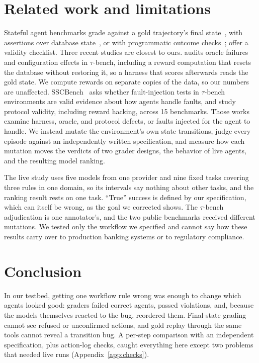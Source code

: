 \documentclass[11pt,a4paper]{article}
\begin{document}
\section{Related work and limitations}

Stateful agent benchmarks grade against a gold trajectory's final state~\citep{yao2025taubench,barres2025tau2}, with assertions over database state~\citep{trivedi2024appworld}, or with programmatic outcome checks~\citep{zhou2024webarena,jimenez2024swebench}; \citet{zhu2025abc} offer a validity checklist. Three recent studies are closest to ours. \citet{chen2026unreliable} audits oracle failures and configuration effects in $\tau$-bench, including a reward computation that resets the database without restoring it, so a harness that scores afterwards reads the gold state. We compute rewards on separate copies of the data, so our numbers are unaffected. SSCBench~\citep{he2026sscbench} asks whether fault-injection tests in $\tau$-bench environments are valid evidence about how agents handle faults, and \citet{shao2026protocol} study protocol validity, including reward hacking, across 15 benchmarks. Those works examine harness, oracle, and protocol defects, or faults injected for the agent to handle. We instead mutate the environment's own state transitions, judge every episode against an independently written specification, and measure how each mutation moves the verdicts of two grader designs, the behavior of live agents, and the resulting model ranking.

The live study uses five models from one provider and nine fixed tasks covering three rules in one domain, so its intervals say nothing about other tasks, and the ranking result rests on one task. ``True'' success is defined by our specification, which can itself be wrong, as the goal we corrected shows. The $\tau$-bench adjudication is one annotator's, and the two public benchmarks received different mutations. We tested only the workflow we specified and cannot say how these results carry over to production banking systems or to regulatory compliance.

\section{Conclusion}

In our testbed, getting one workflow rule wrong was enough to change which agents looked good: graders failed correct agents, passed violations, and, because the models themselves reacted to the bug, reordered them. Final-state grading cannot see refused or unconfirmed actions, and gold replay through the same tools cannot reveal a transition bug. A per-step comparison with an independent specification, plus action-log checks, caught everything here except two problems that needed live runs (Appendix~\ref{app:checks}).
\end{document}
